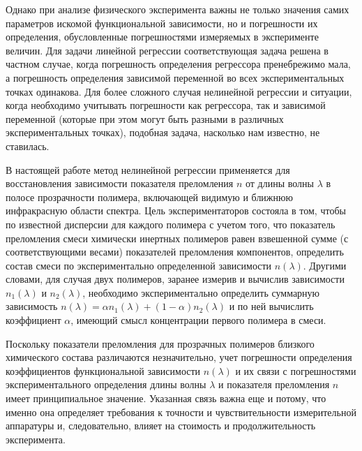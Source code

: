 \documentclass[11pt,a4paper]{article}
\theoremstyle{definition}
\begin{document}
Однако при анализе физического эксперимента важны не только значения самих
параметров искомой функциональной зависимости, но и погрешности их определения,
обусловленные погрешностями измеряемых в эксперименте величин. Для задачи
линейной регрессии соответствующая задача решена в частном случае, когда
погрешность определения регрессора пренебрежимо мала, а погрешность определения
зависимой переменной во всех экспериментальных точках одинакова\cite{Vatunin05}.
Для более сложного случая нелинейной регрессии и ситуации, когда необходимо
учитывать погрешности как регрессора, так и зависимой переменной (которые при
этом могут быть разными в различных экспериментальных точках), подобная задача,
насколько нам известно, не ставилась.

В настоящей работе метод нелинейной регрессии применяется для восстановления
зависимости показателя преломления $n$ от длины волны $\lambda$ в полосе
прозрачности полимера, включающей видимую и ближнюю инфракрасную области спектра.
Цель экспериментаторов состояла в том, чтобы по известной дисперсии для каждого
полимера с учетом того, что показатель преломления смеси химически инертных
полимеров равен взвешенной сумме (с соответствующими весами) показателей
преломления компонентов, определить состав смеси по экспериментально
определенной зависимости $n(\lambda)$. Другими словами, для случая двух
полимеров, заранее измерив и вычислив зависимости $n_1(\lambda)$ и $n_2(\lambda)$,
необходимо экспериментально определить суммарную зависимость
$n(\lambda) = \alpha n_1(\lambda) + (1 - \alpha) n_2(\lambda)$ и по ней
вычислить коэффициент $\alpha$, имеющий смысл концентрации первого полимера в
смеси.

Поскольку показатели преломления для прозрачных полимеров близкого химического
состава различаются незначительно, учет погрешности определения коэффициентов
функциональной зависимости $n(\lambda)$ и их связи с погрешностями
экспериментального определения длины волны $\lambda$ и показателя преломления
$n$ имеет принципиальное значение. Указанная связь важна еще и потому, что
именно она определяет требования к точности и чувствительности измерительной
аппаратуры и, следовательно, влияет на стоимость и продолжительность
эксперимента.
\end{document}
